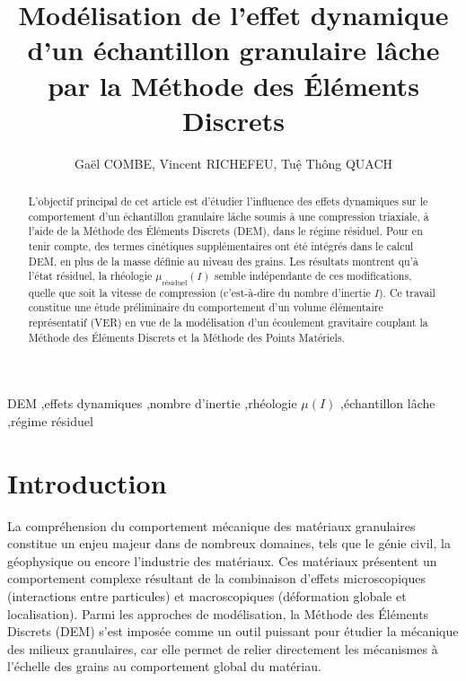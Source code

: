 \begin{frontmatter}

\title{\textbf{Modélisation de l'effet dynamique d'un échantillon granulaire lâche par la Méthode des Éléments Discrets}}

\author{Gaël COMBE, Vincent RICHEFEU, Tuệ Thông QUACH}
\address{Laboratoire 3SR, Université Grenoble Alpes}

\begin{abstract}
L’objectif principal de cet article est d’étudier l’influence des effets dynamiques sur le comportement d’un échantillon granulaire lâche soumis à une compression triaxiale, à l’aide de la Méthode des Éléments Discrets (DEM), dans le régime résiduel. 
Pour en tenir compte, des termes cinétiques supplémentaires ont été intégrés dans le calcul DEM, en plus de la masse définie au niveau des grains.
Les résultats montrent qu’à l’état résiduel, la rhéologie $\mu_{\text{résiduel}}(I)$ semble indépendante de ces modifications, quelle que soit la vitesse de compression (c’est-à-dire du nombre d’inertie $I$). 
Ce travail constitue une étude préliminaire du comportement d’un volume élémentaire représentatif (VER) en vue de la modélisation d’un écoulement gravitaire couplant la Méthode des Éléments Discrets et la Méthode des Points Matériels.
\end{abstract}

\begin{keyword}
DEM \sep effets dynamiques \sep nombre d’inertie \sep rhéologie $\mu(I)$ \sep échantillon lâche \sep régime résiduel
\end{keyword}

\end{frontmatter}

\section{Introduction}

La compréhension du comportement mécanique des matériaux granulaires constitue un enjeu majeur dans de nombreux domaines, tels que le génie civil, la géophysique ou encore l’industrie des matériaux. 
Ces matériaux présentent un comportement complexe résultant de la combinaison d’effets microscopiques (interactions entre particules) et macroscopiques (déformation globale et localisation). 
Parmi les approches de modélisation, la Méthode des Éléments Discrets (DEM) s’est imposée comme un outil puissant pour étudier la mécanique des milieux granulaires, car elle permet de relier directement les mécanismes à l’échelle des grains au comportement global du matériau.


